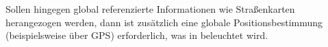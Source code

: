 Sollen hingegen global referenzierte Informationen wie Straßenkarten herangezogen werden, dann ist zusätzlich eine globale Positionsbestimmung (beispielsweise über GPS) erforderlich, was in  beleuchtet wird. 

